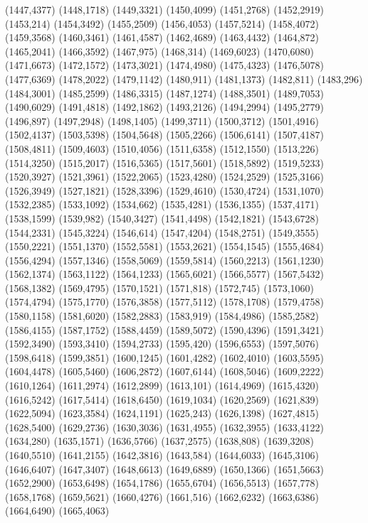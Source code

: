 (1447,4377)
(1448,1718)
(1449,3321)
(1450,4099)
(1451,2768)
(1452,2919)
(1453,214)
(1454,3492)
(1455,2509)
(1456,4053)
(1457,5214)
(1458,4072)
(1459,3568)
(1460,3461)
(1461,4587)
(1462,4689)
(1463,4432)
(1464,872)
(1465,2041)
(1466,3592)
(1467,975)
(1468,314)
(1469,6023)
(1470,6080)
(1471,6673)
(1472,1572)
(1473,3021)
(1474,4980)
(1475,4323)
(1476,5078)
(1477,6369)
(1478,2022)
(1479,1142)
(1480,911)
(1481,1373)
(1482,811)
(1483,296)
(1484,3001)
(1485,2599)
(1486,3315)
(1487,1274)
(1488,3501)
(1489,7053)
(1490,6029)
(1491,4818)
(1492,1862)
(1493,2126)
(1494,2994)
(1495,2779)
(1496,897)
(1497,2948)
(1498,1405)
(1499,3711)
(1500,3712)
(1501,4916)
(1502,4137)
(1503,5398)
(1504,5648)
(1505,2266)
(1506,6141)
(1507,4187)
(1508,4811)
(1509,4603)
(1510,4056)
(1511,6358)
(1512,1550)
(1513,226)
(1514,3250)
(1515,2017)
(1516,5365)
(1517,5601)
(1518,5892)
(1519,5233)
(1520,3927)
(1521,3961)
(1522,2065)
(1523,4280)
(1524,2529)
(1525,3166)
(1526,3949)
(1527,1821)
(1528,3396)
(1529,4610)
(1530,4724)
(1531,1070)
(1532,2385)
(1533,1092)
(1534,662)
(1535,4281)
(1536,1355)
(1537,4171)
(1538,1599)
(1539,982)
(1540,3427)
(1541,4498)
(1542,1821)
(1543,6728)
(1544,2331)
(1545,3224)
(1546,614)
(1547,4204)
(1548,2751)
(1549,3555)
(1550,2221)
(1551,1370)
(1552,5581)
(1553,2621)
(1554,1545)
(1555,4684)
(1556,4294)
(1557,1346)
(1558,5069)
(1559,5814)
(1560,2213)
(1561,1230)
(1562,1374)
(1563,1122)
(1564,1233)
(1565,6021)
(1566,5577)
(1567,5432)
(1568,1382)
(1569,4795)
(1570,1521)
(1571,818)
(1572,745)
(1573,1060)
(1574,4794)
(1575,1770)
(1576,3858)
(1577,5112)
(1578,1708)
(1579,4758)
(1580,1158)
(1581,6020)
(1582,2883)
(1583,919)
(1584,4986)
(1585,2582)
(1586,4155)
(1587,1752)
(1588,4459)
(1589,5072)
(1590,4396)
(1591,3421)
(1592,3490)
(1593,3410)
(1594,2733)
(1595,420)
(1596,6553)
(1597,5076)
(1598,6418)
(1599,3851)
(1600,1245)
(1601,4282)
(1602,4010)
(1603,5595)
(1604,4478)
(1605,5460)
(1606,2872)
(1607,6144)
(1608,5046)
(1609,2222)
(1610,1264)
(1611,2974)
(1612,2899)
(1613,101)
(1614,4969)
(1615,4320)
(1616,5242)
(1617,5414)
(1618,6450)
(1619,1034)
(1620,2569)
(1621,839)
(1622,5094)
(1623,3584)
(1624,1191)
(1625,243)
(1626,1398)
(1627,4815)
(1628,5400)
(1629,2736)
(1630,3036)
(1631,4955)
(1632,3955)
(1633,4122)
(1634,280)
(1635,1571)
(1636,5766)
(1637,2575)
(1638,808)
(1639,3208)
(1640,5510)
(1641,2155)
(1642,3816)
(1643,584)
(1644,6033)
(1645,3106)
(1646,6407)
(1647,3407)
(1648,6613)
(1649,6889)
(1650,1366)
(1651,5663)
(1652,2900)
(1653,6498)
(1654,1786)
(1655,6704)
(1656,5513)
(1657,778)
(1658,1768)
(1659,5621)
(1660,4276)
(1661,516)
(1662,6232)
(1663,6386)
(1664,6490)
(1665,4063)
